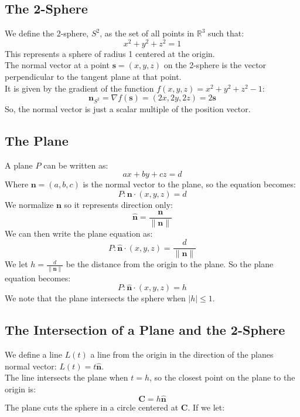\documentclass[11pt]{article}
\begin{document}
\newpage

\subsection*{The 2-Sphere}
We define the 2-sphere, $S^2$, as the set of all points in $\mathbb{R}^3$ such that:
$$x^2 + y^2 + z^2 = 1$$
This represents a sphere of radius 1 centered at the origin. \\
The normal vector at a point $\mathbf{s} = (x, y, z)$ on the 2-sphere is the vector perpendicular to the tangent plane at that point. \\
It is given by the gradient of the function $f(x,y,z) = x^2 + y^2 + z^2 - 1$:
$$\mathbf{n}_{S^2} = \nabla f(\mathbf{s}) = (2x, 2y, 2z) = 2\textbf{s}$$
So, the normal vector is just a scalar multiple of the position vector. 
\subsection*{The Plane}
A plane $P$ can be written as:
$$ax + by + cz = d$$
Where $\textbf{n} = (a,b,c)$ is the normal vector to the plane, so the equation becomes:
$$P : \textbf{n} \cdot (x,y,z) = d$$
We normalize $\textbf{n}$ so it represents direction only:
$$\hat{\textbf{n}} = \frac{\textbf{n}}{\|\textbf{n}\|}$$
We can then write the plane equation as:
$$P : \hat{\textbf{n}} \cdot (x,y,z) = \frac{d}{\|\textbf{n}\|}$$
We let $h = \frac{d}{\|\textbf{n}\|}$ be the distance from the origin to the plane.
So the plane equation becomes:
$$P : \hat{\textbf{n}} \cdot (x,y,z) = h$$
We note that the plane intersects the sphere when $|h| \leq 1$.
\newpage
\subsection*{The Intersection of a Plane and the 2-Sphere}
We define a line $L(t)$ a line from the origin in the direction of the planes normal vector: $L(t) = t \hat{\textbf{n}}$. \\
The line intersects the plane when $t= h$, so the closest point on the plane to the origin is:
$$\mathbf{C} = h \hat{\mathbf{n}}
$$
The plane cuts the sphere in a circle centered at $\mathbf{C}$.
If we let:
\noindent
\end{document}
